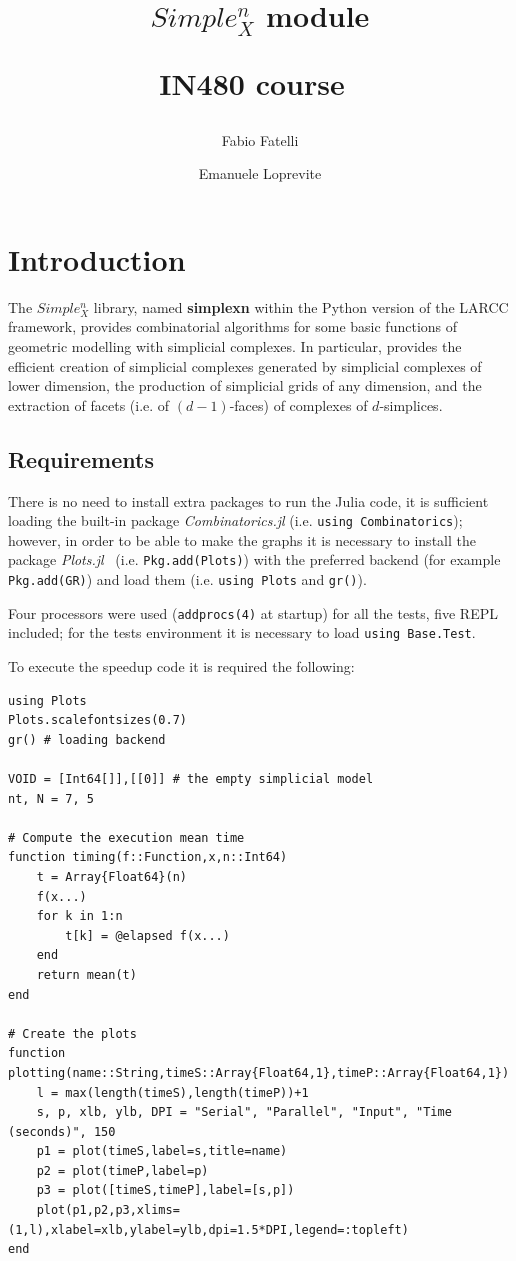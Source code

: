 \documentclass[a4paper,12pt,titlepage]{article}					%
\title{$Simple_{X}^{n}$ module\\\begin{small}IN480 course~\cite{Paoluzzi:coursewebpage}\end{small}}
\author{Fabio Fatelli \and Emanuele Loprevite}
\begin{document}
\maketitle

\tableofcontents
\thispagestyle{plain}

\clearpage

\section{Introduction}
The $Simple^n_X$ library, named \textbf{simplexn} within the Python version of the LARCC framework, provides combinatorial algorithms for some basic functions of geometric modelling with simplicial complexes. In particular, provides the efficient creation of simplicial complexes generated by simplicial complexes of lower dimension, the production of simplicial grids of any dimension, and the extraction of facets (i.e. of $(d-1)$-faces) of complexes of $d$-simplices.~\cite{Paoluzzi:simplexn}

\subsection{Requirements}
There is no need to install extra packages to run the Julia code, it is sufficient loading the built-in package \emph{Combinatorics.jl} (i.e. \texttt{using Combinatorics}); however, in order to be able to make the graphs it is necessary to install the package \emph{Plots.jl}~\cite{Julia:plots} (i.e. \texttt{Pkg.add(\textquotedbl Plots\textquotedbl)}) with the preferred backend (for example \texttt{Pkg.add(\textquotedbl GR\textquotedbl)}) and load them (i.e. \texttt{using Plots} and \texttt{gr()}).

Four processors were used (\texttt{addprocs(4)} at startup) for all the tests, five REPL included; for the tests environment it is necessary to load \texttt{using Base.Test}.

To execute the speedup code it is required the following:
\begin{Verbatim}
using Plots
Plots.scalefontsizes(0.7)
gr() # loading backend

VOID = [Int64[]],[[0]] # the empty simplicial model
nt, N = 7, 5

# Compute the execution mean time
function timing(f::Function,x,n::Int64)
	t = Array{Float64}(n)
	f(x...)
	for k in 1:n
		t[k] = @elapsed f(x...)
	end
	return mean(t)
end

# Create the plots
function plotting(name::String,timeS::Array{Float64,1},timeP::Array{Float64,1})
	l = max(length(timeS),length(timeP))+1
	s, p, xlb, ylb, DPI = "Serial", "Parallel", "Input", "Time (seconds)", 150
	p1 = plot(timeS,label=s,title=name)
	p2 = plot(timeP,label=p)
	p3 = plot([timeS,timeP],label=[s,p])
	plot(p1,p2,p3,xlims=(1,l),xlabel=xlb,ylabel=ylb,dpi=1.5*DPI,legend=:topleft)
end
\end{Verbatim}
\end{document}
